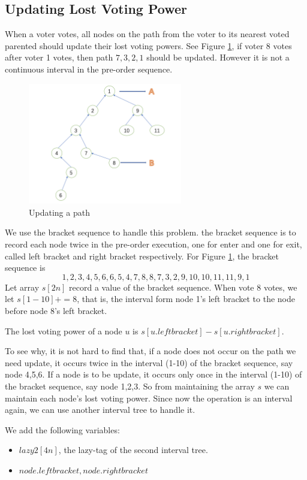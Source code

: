 \subsection{Updating Lost Voting Power}
When a voter votes, all nodes on the path from the voter to its nearest voted parented should update their lost voting powers. See Figure \ref{fig:2}, if voter 8 votes after voter 1 votes, then path $7,3,2,1$ should be updated. However it is not a continuous interval in the pre-order sequence. 
\begin{figure}
	\label{fig:2}
	\includegraphics[width=0.6\textwidth]{3.png}
	\caption{Updating a path}
\end{figure}
We use the bracket sequence to handle this problem. the bracket sequence is to record each node twice in the pre-order execution, one for enter and one for exit, called left bracket and right bracket respectively. For Figure \ref{fig:2}, the bracket sequence is
$$1,2,3,4,5,6,6,5,4,7,8,8,7,3,2,9,10,10,11,11,9,1$$
Let array $s[2n]$ record a value of the bracket sequence. When vote 8 votes, we let $s[1-10]+=8$, that is, the interval form node 1's left bracket to the node before node 8's left bracket.

The lost voting power of a node $u$ is $s[u.leftbracket]-s[u.rightbracket]$. 

To see why, it is not hard to find that, if a node does not occur on the path we need update, it occurs twice in the interval (1-10) of the bracket sequence, say node 4,5,6. If a node is to be update, it occurs only once in the interval  (1-10) of the bracket sequence, say node 1,2,3. So from maintaining the array $s$ we can maintain each node's lost voting power. Since now the operation is an interval again, we can use another interval tree to handle it.

We add the following variables:
\begin{itemize}
\item $lazy2[4n]$, the lazy-tag of the second interval tree.
\item $node.leftbracket,node.rightbracket$
\end{itemize}

